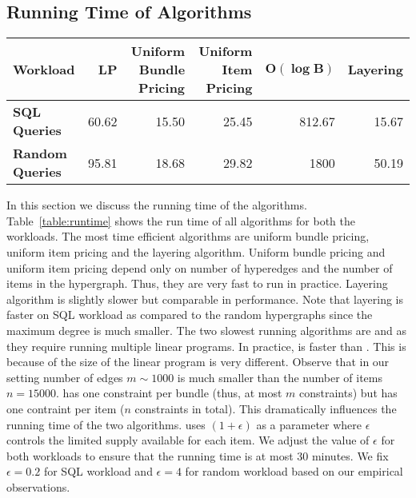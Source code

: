 \subsection{Running Time of Algorithms}

\begin{table*}[] \centering
	\begin{small}
		\begin{tabular}{@{}lrrrrr@{}}\toprule
			\textbf{Workload} & \textbf{LP} & \textbf{Uniform Bundle Pricing} & \textbf{Uniform Item Pricing} & $\mathbf{O(\log B)}$ & \textbf{Layering}  \\ \midrule
			
			\textbf{SQL Queries} &  60.62 & 15.50 & 25.45 & 812.67 & 15.67 \\ \hdashline
			\textbf{Random Queries} &  95.81 & 18.68 &  29.82 &1800 & 50.19 \\
			\bottomrule
		\end{tabular}
	\end{small}
	\caption{Algorithm running times (in seconds) for different workloads}
	\label{table:runtime}
\end{table*}

In this section we discuss the running time of the algorithms. Table~\ref{table:runtime} shows the run time of all algorithms for both the workloads. The most time efficient algorithms are uniform bundle pricing, uniform item pricing and the layering algorithm. Uniform bundle pricing and uniform item pricing depend only on number of hyperedges and the number of items in the hypergraph. Thus, they are very fast to run in practice. Layering algorithm is slightly slower but comparable in performance. Note that layering is faster on SQL workload as compared to the random hypergraphs since the maximum degree is much smaller. The two slowest running algorithms are \lpip and \cip as they require running multiple linear programs. In practice, \lpip is faster than \cip. This is because of the size of the linear program is very different. Observe that in our setting number of edges $m \sim 1000$ is much smaller than the number of items $n = 15000$. \lpip  has one constraint per bundle (thus, at most $m$ constraints) but \cip has one contraint per item ($n$ constraints in total). This dramatically influences the running time of the two algorithms. \cip uses $(1+\epsilon)$ as a parameter where $\epsilon$ controls the limited supply available for each item. We adjust the value of $\epsilon$ for both workloads to ensure that the running time is at most $30$ minutes. We fix $\epsilon = 0.2$ for SQL workload and $\epsilon = 4$ for random workload based on our empirical observations.
